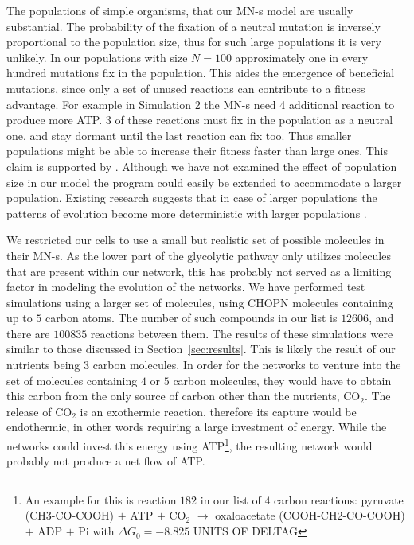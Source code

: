 \documentclass[a4paper,12pt]{article}
\begin{document}
The populations of simple organisms, that our MN-s model are usually substantial. The probability of the fixation of a neutral mutation is inversely proportional to the population size, thus for such large populations it is very unlikely. In our populations with size $N=100$ approximately one in every hundred mutations fix in the population. This aides the emergence of beneficial mutations, since only a set of unused reactions can contribute to a fitness advantage. For example in Simulation 2 the MN-s need 4 additional reaction to produce more ATP. $3$ of these reactions must fix in the population as a neutral one, and stay dormant until the last reaction can fix too. Thus smaller populations might be able to increase their fitness faster than large ones. This claim is supported by \cite{smallpopulation}. 
Although we have not examined the effect of population size in our model the program could easily be extended to accommodate a larger population. Existing research suggests that in case of larger populations the patterns of evolution become more deterministic with larger populations \cite{predictability}.


We restricted our cells to use a small but realistic set of possible molecules in their MN-s. As the lower part of the glycolytic pathway only utilizes molecules that are present within our network, this has probably not served as a limiting factor in modeling the evolution of the networks. We have performed test simulations using a larger set of molecules, using CHOPN molecules containing up to $5$ carbon atoms. The number of such compounds in our list is $12606$, and there are $100 835$ reactions between them. The results of these simulations were similar to those discussed in Section~\ref{sec:results}. This is likely the result of our nutrients being $3$ carbon molecules. In order for the networks to venture into the set of molecules containing $4$ or $5$ carbon molecules, they would have to obtain this carbon from the only source of carbon other than the nutrients,  CO$_2$. The release of CO$_2$ is an exothermic reaction, therefore its capture would be endothermic, in other words requiring a large investment of energy. While the networks could invest this energy using ATP\footnote{ An example for this is reaction $182$ in our list of $4$ carbon reactions: pyruvate (CH3-CO-COOH) $+$ ATP $+$ CO$_2$ $\rightarrow$   oxaloacetate (COOH-CH2-CO-COOH) $+$ ADP $+$ Pi with $\Delta G_0=-8.825$ UNITS OF DELTAG}, the resulting network would probably not produce a net flow of ATP. 
\end{document}
